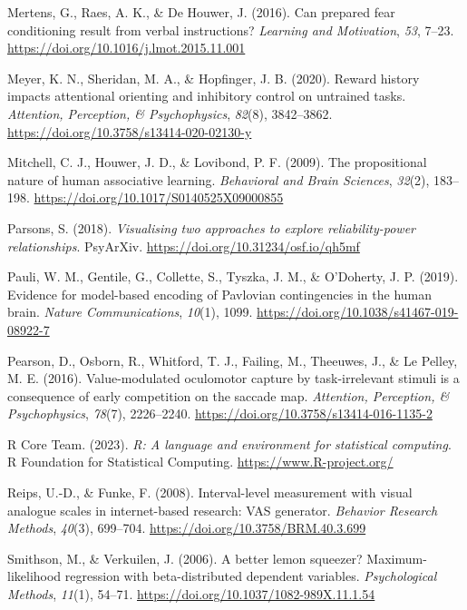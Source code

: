 \documentclass[
  man,
  floatsintext,
  longtable,
  nolmodern,
  notxfonts,
  notimes,
  colorlinks=true,linkcolor=blue,citecolor=blue,urlcolor=blue]{apa7}
\newlength{\cslhangindent}
\newenvironment{CSLReferences}[2] %
 {\begin{list}{}{%
  \setlength{\itemindent}{0pt}
  \setlength{\leftmargin}{0pt}
  \setlength{\parsep}{0pt}
  \ifodd #1
   \setlength{\leftmargin}{\cslhangindent}
   \setlength{\itemindent}{-1\cslhangindent}
  \fi
  \setlength{\itemsep}{#2\baselineskip}}}
 {\end{list}}
\begin{document}
\begin{CSLReferences}{1}{0}
Mertens, G., Raes, A. K., \& De Houwer, J. (2016). Can prepared fear
conditioning result from verbal instructions? \emph{Learning and
Motivation}, \emph{53}, 7--23.
\url{https://doi.org/10.1016/j.lmot.2015.11.001}

Meyer, K. N., Sheridan, M. A., \& Hopfinger, J. B. (2020). Reward
history impacts attentional orienting and inhibitory control on
untrained tasks. \emph{Attention, Perception, \& Psychophysics},
\emph{82}(8), 3842--3862.
\url{https://doi.org/10.3758/s13414-020-02130-y}

Mitchell, C. J., Houwer, J. D., \& Lovibond, P. F. (2009). The
propositional nature of human associative learning. \emph{Behavioral and
Brain Sciences}, \emph{32}(2), 183--198.
\url{https://doi.org/10.1017/S0140525X09000855}

Parsons, S. (2018). \emph{Visualising two approaches to explore
reliability-power relationships}. PsyArXiv.
\url{https://doi.org/10.31234/osf.io/qh5mf}

Pauli, W. M., Gentile, G., Collette, S., Tyszka, J. M., \& O'Doherty, J.
P. (2019). Evidence for model-based encoding of Pavlovian contingencies
in the human brain. \emph{Nature Communications}, \emph{10}(1), 1099.
\url{https://doi.org/10.1038/s41467-019-08922-7}

Pearson, D., Osborn, R., Whitford, T. J., Failing, M., Theeuwes, J., \&
Le Pelley, M. E. (2016). Value-modulated oculomotor capture by
task-irrelevant stimuli is a consequence of early competition on the
saccade map. \emph{Attention, Perception, \& Psychophysics},
\emph{78}(7), 2226--2240.
\url{https://doi.org/10.3758/s13414-016-1135-2}

R Core Team. (2023). \emph{R: A language and environment for statistical
computing}. R Foundation for Statistical Computing.
\url{https://www.R-project.org/}

Reips, U.-D., \& Funke, F. (2008). Interval-level measurement with
visual analogue scales in internet-based research: VAS generator.
\emph{Behavior Research Methods}, \emph{40}(3), 699--704.
\url{https://doi.org/10.3758/BRM.40.3.699}

Smithson, M., \& Verkuilen, J. (2006). A better lemon squeezer?
Maximum-likelihood regression with beta-distributed dependent variables.
\emph{Psychological Methods}, \emph{11}(1), 54--71.
\url{https://doi.org/10.1037/1082-989X.11.1.54}


\end{CSLReferences}
\end{document}
